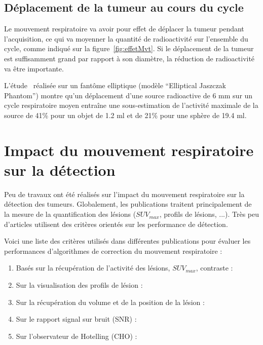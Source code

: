 \subsection{Déplacement de la tumeur au cours du cycle}

Le mouvement respiratoire va avoir pour effet de déplacer la tumeur pendant l'acquisition, ce qui va moyenner la quantité de radioactivité sur l'ensemble du cycle, comme indiqué sur la figure~\ref{fig:effetMvt}. Si le déplacement de la tumeur est suffisamment grand par rapport à son diamètre, la réduction de radioactivité va être importante.

L'étude~\cite{boucher2004respiratory} réalisée sur un fantôme elliptique (modèle ``Elliptical Jaszczak Phantom'') montre qu'un déplacement d'une source radioactive de 6 mm sur un cycle respiratoire moyen entraîne une sous-estimation de l'activité maximale de la source de 41\% pour un objet de 1.2 ml et de 21\% pour une sphère de 19.4 ml.


\section{Impact du mouvement respiratoire sur la détection}

Peu de travaux ont été réalisés sur l'impact du mouvement respiratoire sur la détection des tumeurs. Globalement, les publications traitent  principalement de la mesure de la quantification des lésions ($SUV_{max}$, profils de lésions, ...). Très peu d'articles utilisent des critères orientés sur les performance de détection.

Voici une liste des critères utilisés dans différentes publications pour évaluer les performances d'algorithmes de correction du mouvement respiratoire :

\begin{enumerate}
 \item Basés sur la récupération de l'activité des lésions, $SUV_{max}$, contraste :~\cite{GuopingChang2010Implementation,lamare2007list,nehmeh2002effect,detorie2008quantitative}
 \item Sur la visualisation des profils de lésion :~\cite{GuopingChang2010Implementation,Thielemans2006Lesion,lamare2007list}
 \item Sur la récupération du volume et de la position de la lésion :~\cite{GuopingChang2010Implementation,lamare2007list,nehmeh2002effect}
 \item Sur le rapport signal sur bruit (SNR) :~\cite{GuopingChang2010Implementation}
 \item Sur l'observateur de Hotelling (CHO) :~\cite{Thielemans2006Lesion}
\end{enumerate}

